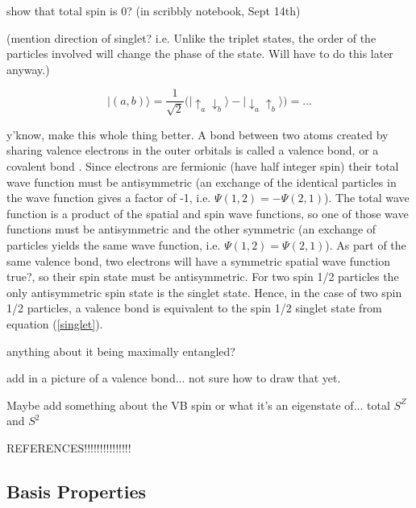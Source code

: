   {\color{red} show that total spin is 0? (in scribbly notebook, Sept 14th)
  
  (mention direction of singlet? i.e. Unlike the triplet states, the order of the particles involved will change the phase of the state.  Will have to do this later anyway.)

\begin{equation}
   \lvert(a,b)\rangle = \frac{1}{\sqrt{2}}\big( \lvert \uparrow_a \downarrow_b \rangle - \lvert \downarrow_a \uparrow_b \rangle \big) = ...
   \label{eqn_vb}
\end{equation}
}

{\color{red} y'know, make this whole thing better.}
A bond between two atoms created by sharing valence electrons in the outer orbitals is called a valence bond, or a covalent bond \cite{Slater1931,Pauling1933}.
Since electrons are fermionic (have half integer spin) their total
wave function must be antisymmetric (an exchange of the identical particles in the wave function
gives a factor of -1, i.e. $\Psi(1,2) = -\Psi(2,1)$).
The total wave function is a product of the spatial and spin wave functions, so one of those wave functions must be antisymmetric and the other symmetric (an exchange of particles yields the same wave function, i.e. $\Psi(1,2) = \Psi(2,1)$).
As part of the same valence bond, two electrons will have a symmetric spatial wave function {\color{red} true?}, so their spin state must be antisymmetric.  For two spin 1/2 particles the only antisymmetric spin state is the singlet state.  
Hence, in the case of two spin 1/2 particles, a valence bond is equivalent to the spin 1/2 singlet state from equation (\ref{singlet}).

{\color{red} anything about it being maximally entangled?}

{\color{red} add in a picture of a valence bond... not sure how to draw that yet.

 Maybe add something about the VB spin or what it's an eigenstate of... total 
$S^Z$ and $S^2$

REFERENCES!!!!!!!!!!!!!!!
}

\subsection{Basis Properties}

